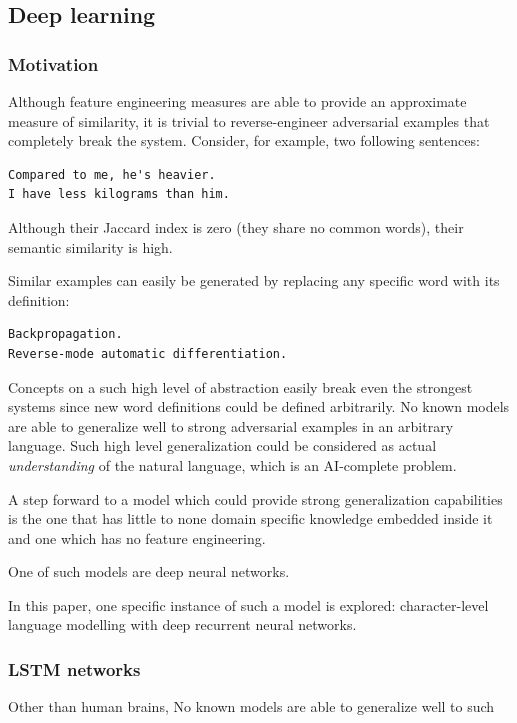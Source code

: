 \documentclass[10pt, a4paper]{article}
\begin{document}
\begin{table}[h!]
\subsection{Deep learning}

\subsubsection{Motivation}
Although feature engineering measures are able to provide an approximate measure of similarity, it is trivial to reverse-engineer adversarial examples that completely break the system.
Consider, for example, two following sentences:

\begin{lstlisting}
Compared to me, he's heavier.
I have less kilograms than him.
\end{lstlisting}

Although their Jaccard index is zero (they share no common words), their semantic similarity is high.

Similar examples can easily be generated by replacing any specific word with its definition:
\begin{lstlisting}
Backpropagation.
Reverse-mode automatic differentiation.
\end{lstlisting}

Concepts on a such high level of abstraction easily break even the strongest systems since new word definitions could be defined arbitrarily.
No known models are able to generalize well to strong adversarial examples in an arbitrary language. 
Such high level generalization could be considered as actual \textit{understanding} of the natural language, which is an AI-complete problem.

A step forward to a model which could provide strong generalization capabilities is the one that has little to none domain specific knowledge embedded inside it and one which has no feature engineering.

One of such models are deep neural networks.

In this paper, one specific instance of such a model is explored: character-level language modelling with deep recurrent neural networks.

\subsubsection{LSTM networks}

Other than human brains, No known models are able to generalize well to such 


\end{table}
\end{document}
